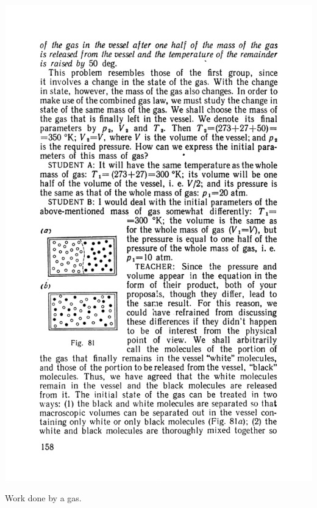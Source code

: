 \documentclass[a4paper,sfsidenotes]{tufte-book}
\begin{document}
\begin{marginfigure}%
\centering
\includegraphics[width=\linewidth]{fig-081a}
\caption{Work done by a gas.}
\label{fig-81}
\end{marginfigure}
\end{document}
